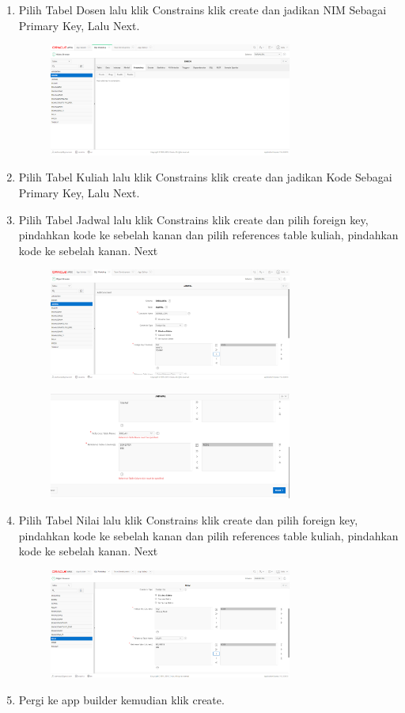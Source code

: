 \begin{enumerate}
    \item Pilih Tabel Dosen lalu klik Constrains klik create dan jadikan NIM Sebagai Primary Key, Lalu Next. 
        \begin{figure}[h]
        \centerline{\includegraphics[width=8cm]{Figures/constraintdosen.PNG}}
        \end{figure}
     \item Pilih Tabel Kuliah lalu klik Constrains klik create dan jadikan Kode Sebagai Primary Key, Lalu Next.
     \item Pilih Tabel Jadwal lalu klik Constrains klik create dan pilih foreign key, pindahkan kode ke sebelah kanan dan pilih references table kuliah, pindahkan kode ke sebelah kanan. Next
        \begin{figure}[h]
        \centerline{\includegraphics[width=8cm]{Figures/constraintjadwal.PNG}}
        \end{figure}
        \begin{figure}[h]
        \centerline{\includegraphics[width=8cm]{Figures/constraintjadwal2.PNG}}
        \end{figure}
    \item Pilih Tabel Nilai lalu klik Constrains klik create dan pilih foreign key, pindahkan kode ke sebelah kanan dan pilih references table kuliah, pindahkan kode ke sebelah kanan. Next
        \begin{figure}[h]
        \centerline{\includegraphics[width=8cm]{Figures/constrainsnilai.PNG}}
        \end{figure}
    \item Pergi ke app builder kemudian klik create.

\end{enumerate}
